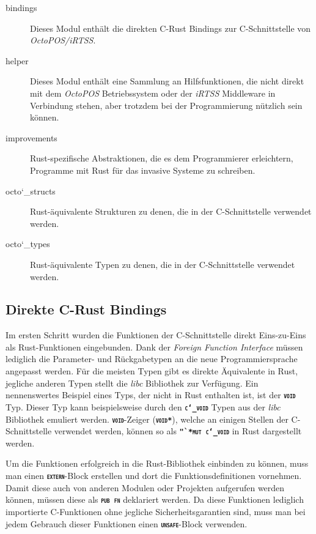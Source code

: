 \begin{description}

	\item[bindings] 
	Dieses Modul enthält die direkten C-Rust Bindings zur C-Schnittstelle von \textit{OctoPOS/iRTSS}.
	
	\item[helper]
	Dieses Modul enthält eine Sammlung an Hilfsfunktionen, die nicht direkt mit dem \textit{OctoPOS} Betriebssystem 
	oder der \textit{iRTSS} Middleware in Verbindung stehen, aber trotzdem bei der Programmierung
	nützlich sein können.
	
	\item[improvements]
	Rust-spezifische Abstraktionen, die es dem Programmierer erleichtern, Programme mit Rust für das invasive
	Systeme zu schreiben.
	
	\item[octo\char`_structs]
	Rust-äquivalente Strukturen zu denen, die in der C-Schnittstelle verwendet werden.
	
	\item[octo\char`_types]
	Rust-äquivalente Typen zu denen, die in der C-Schnittstelle verwendet werden.

\end{description}

\subsection{Direkte C-Rust Bindings}

Im ersten Schritt wurden die Funktionen der C-Schnittstelle direkt Eins-zu-Eins als Rust-Funktionen eingebunden.
Dank der \textit{Foreign Function Interface} müssen lediglich die Parameter- und Rückgabetypen
an die neue Programmiersprache angepasst werden.
Für die meisten Typen gibt es direkte Äquivalente in Rust, jegliche anderen Typen
stellt die \textit{libc} Bibliothek zur Verfügung. Ein nennenswertes Beispiel eines Typs, der nicht in Rust enthalten 
ist, ist der \texttt{\textsc{\textbf{void}}} Typ. Dieser Typ kann beispielsweise durch den
\texttt{\textsc{\textbf{c\char`_void}}} Typen aus der \textit{libc} Bibliothek emuliert werden.
\texttt{\textsc{\textbf{void}}}-Zeiger (\texttt{\textsc{\textbf{void*}}}), welche an einigen Stellen der
C-Schnittstelle verwendet werden, können so als \texttt{\textsc{\textbf{"`*mut c\char`_void}}} in Rust
dargestellt werden.

Um die Funktionen erfolgreich in die Rust-Bibliothek einbinden zu können,
muss man einen \texttt{\textsc{\textbf{extern}}}-Block erstellen und dort
die Funktionsdefinitionen vornehmen.
Damit diese auch von anderen Modulen oder Projekten aufgerufen werden können, müssen diese
als \texttt{\textsc{\textbf{pub fn}}} deklariert werden.
Da diese Funktionen lediglich importierte C-Funktionen ohne jegliche Sicherheitsgarantien
sind, muss man bei jedem Gebrauch dieser Funktionen einen \texttt{\textsc{\textbf{unsafe}}}-Block verwenden.

